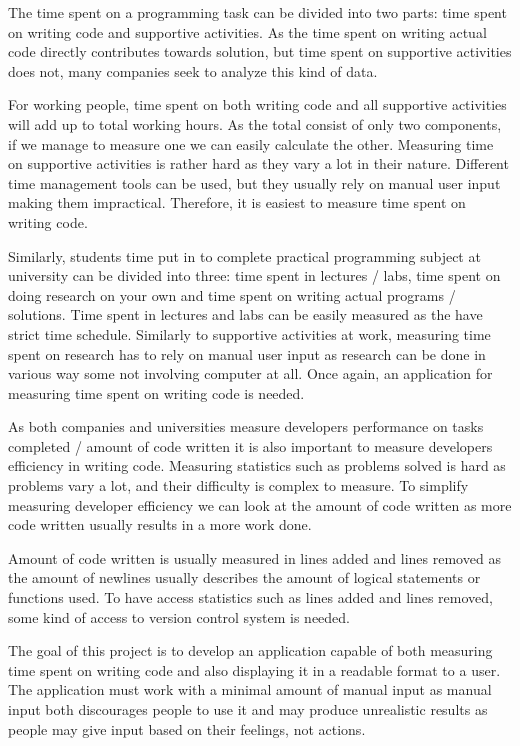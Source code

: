 The time spent on a programming task can be divided into two parts: time spent on writing code and supportive activities.
As the time spent on writing actual code directly contributes towards solution, but time spent on supportive activities does not,
many companies seek to analyze this kind of data.

For working people, time spent on both writing code and all supportive activities will add up to total working hours.
As the total consist of only two components, if we manage to measure one we can easily calculate the other.
Measuring time on supportive activities is rather hard as they vary a lot in their nature.
Different time management tools can be used, but they usually rely on manual user input making them impractical.
Therefore, it is easiest to measure time spent on writing code.

Similarly, students time put in to complete practical programming subject at university can be divided into three: time spent in lectures / labs,
time spent on doing research on your own and time spent on writing actual programs / solutions.
Time spent in lectures and labs can be easily measured as the have strict time schedule.
Similarly to supportive activities at work, measuring time spent on research has to rely on manual user input as research can be done in various way some not involving computer at all.
Once again, an application for measuring time spent on writing code is needed.

As both companies and universities measure developers performance on tasks completed / amount of code written it is also important to measure
developers efficiency in writing code.
Measuring statistics such as problems solved is hard as problems vary a lot, and their difficulty is complex to measure.
To simplify measuring developer efficiency we can look at the amount of code written as more code written usually results in a more work done.

Amount of code written is usually measured in lines added and lines removed as the amount of newlines usually describes the amount
of logical statements or functions used.
To have access statistics such as lines added and lines removed, some kind of access to version control system is needed.

The goal of this project is to develop an application capable of both measuring time spent on writing code and also
displaying it in a readable format to a user.
The application must work with a minimal amount of manual input as manual input both discourages people to use it and may produce
unrealistic results as people may give input based on their feelings, not actions.


